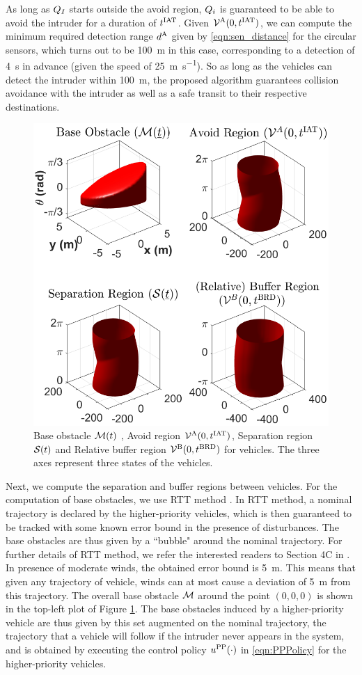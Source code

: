 As long as $Q_{I}$ starts outside the avoid region, $Q_i$ is guaranteed to be able to avoid the intruder for a duration of $t^\text{IAT}$. Given $\mathcal{V}^{\text{A}}(0, t^\text{IAT})$, we can compute the minimum required detection range $d^\text{A}$ given by \eqref{eqn:sen_distance} for the circular sensors, which turns out to be \SI{100}{\m} in this case, corresponding to a detection of \SI{4}{\s} in advance (given the speed of \SI{25}{\m\per\s}). So as long as the vehicles can detect the intruder within \SI{100}{\m}, the proposed algorithm guarantees collision avoidance with the intruder as well as a safe transit to their respective destinations.   
\begin{figure}
  \centering
  \includegraphics[width=0.7\columnwidth]{"figs/bufferRegion_steps"}
  \caption{Base obstacle $\mathcal{M}(t)$ , Avoid region $\mathcal{V}^{\text{A}}(0, t^\text{IAT})$, Separation region $\mathcal{S}(t)$ and Relative buffer region $\mathcal{V}^{\text{B}}(0, t^\text{BRD})$ for vehicles. The three axes represent three states of the vehicles.}
  \label{fig:MaxMin}
\end{figure}

Next, we compute the separation and buffer regions between vehicles. For the computation of base obstacles, we use RTT method \cite{Bansal2017}. In RTT method, a nominal trajectory is declared by the higher-priority vehicles, which is then guaranteed to be tracked with some known error bound in the presence of disturbances. The base obstacles are thus given by a ``bubble" around the nominal trajectory. For further details of RTT method, we refer the interested readers to Section 4C in \cite{Bansal2017}. In presence of moderate winds, the obtained error bound is \SI{5}{\m}. This means that given any trajectory of vehicle, winds can at most cause a deviation of \SI{5}{\m} from this trajectory. The overall base obstacle $\mathcal{M}$ around the point $(0, 0, 0)$ is shown in the top-left plot of Figure \ref{fig:MaxMin}. The base obstacles induced by a higher-priority vehicle are thus given by this set augmented on the nominal trajectory, the trajectory that a vehicle will follow if the intruder never appears in the system, and is obtained by executing the control policy ${u^{\text{PP}}}(\cdot)$ in \eqref{eqn:PPPolicy} for the higher-priority vehicles.

